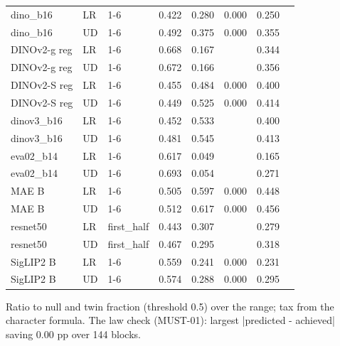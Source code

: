 \begin{table}[t]
\begin{tabular}{lllrrrrr}
dino\_b16 & LR & 1-6 & 0.422 & 0.280 & 0.000 & 0.250 &  \\
dino\_b16 & UD & 1-6 & 0.492 & 0.375 & 0.000 & 0.355 &  \\
DINOv2-g reg & LR & 1-6 & 0.668 & 0.167 &  & 0.344 &  \\
DINOv2-g reg & UD & 1-6 & 0.672 & 0.166 &  & 0.356 &  \\
DINOv2-S reg & LR & 1-6 & 0.455 & 0.484 & 0.000 & 0.400 &  \\
DINOv2-S reg & UD & 1-6 & 0.449 & 0.525 & 0.000 & 0.414 &  \\
dinov3\_b16 & LR & 1-6 & 0.452 & 0.533 &  & 0.400 &  \\
dinov3\_b16 & UD & 1-6 & 0.481 & 0.545 &  & 0.413 &  \\
eva02\_b14 & LR & 1-6 & 0.617 & 0.049 &  & 0.165 &  \\
eva02\_b14 & UD & 1-6 & 0.693 & 0.054 &  & 0.271 &  \\
MAE B & LR & 1-6 & 0.505 & 0.597 & 0.000 & 0.448 &  \\
MAE B & UD & 1-6 & 0.512 & 0.617 & 0.000 & 0.456 &  \\
resnet50 & LR & first\_half & 0.443 & 0.307 &  & 0.279 &  \\
resnet50 & UD & first\_half & 0.467 & 0.295 &  & 0.318 &  \\
SigLIP2 B & LR & 1-6 & 0.559 & 0.241 & 0.000 & 0.231 &  \\
SigLIP2 B & UD & 1-6 & 0.574 & 0.288 & 0.000 & 0.295 &  \\
\bottomrule
\end{tabular}
\par\smallskip\footnotesize Ratio to null and twin fraction (threshold 0.5) over the range; tax from the character formula. The law check (MUST-01): largest |predicted - achieved| saving 0.00 pp over 144 blocks.
\end{table}
